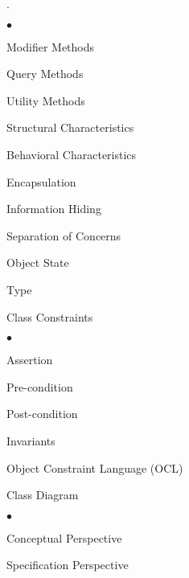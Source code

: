 \documentclass[11pt]{article}
\begin{document}
{\begin{list}{.}
\begin{list}{$\bullet$}{\itemsep 0.01in \parskip 0in \parsep 0in}
        \item Modifier Methods

        \item Query Methods

        \item Utility Methods

    \end{list}


\item Structural Characteristics

\item Behavioral Characteristics

\item Encapsulation

\item Information Hiding

\item Separation of Concerns

\item Object State

\item Type

\item Class Constraints

    \begin{list}{$\bullet$}{\itemsep 0.01in \parskip 0in \parsep 0in}

        \item Assertion

        \item Pre-condition

        \item Post-condition

        \item Invariants

        \item Object Constraint Language (OCL)

    \end{list}



\item Class Diagram

    \begin{list}{$\bullet$}{\itemsep 0.01in \parskip 0in \parsep 0in}

    \item Conceptual Perspective

    \item Specification Perspective


\end{list}
\end{list}}
\end{document}
